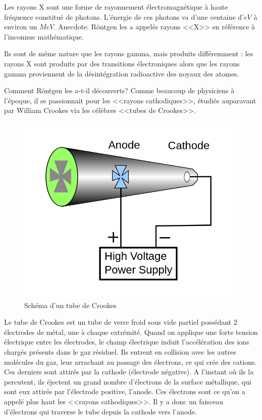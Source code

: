 Les rayons X sont une forme de rayonnement électromagnétique à haute fréquence constitué de photons. L'énergie de ces photons va d'une centaine d'$eV$ à environ un $MeV$. Anecdote: Röntgen les a appelés rayons <<X>> en référence à l'inconnue mathématique.

Ils sont de même nature que les rayons gamma, mais produits différemment : les rayons X sont produits par des transitions électroniques alors que les rayons gamma proviennent de la désintégration radioactive des noyaux des atomes.

Comment Röntgen les a-t-il découverts? Comme beaucoup de physiciens à l'époque, il se passionnait pour les <<rayons cathodiques>>, étudiés auparavant par William Crookes via les célèbres <<tubes de Crookes>>.

\begin{figure}[ht]
    \centering
    \includegraphics[scale=0.20]{Images1/tubecrookes.png}
    \caption{Schéma d'un tube de Crookes}
\end{figure}

Le tube de Crookes est un tube de verre froid sous vide partiel possédant 2 électrodes de métal, une à chaque extrémité. Quand on applique une forte tension électrique entre les électrodes, le champ électrique induit l'accélération des ions chargés présents dans le gaz résiduel. Ils entrent en collision avec les autres molécules du gaz, leur arrachant au passage des électrons, ce qui crée des cations. Ces derniers sont attirés par la cathode (électrode négative). A l'instant où ils la percutent, ils éjectent un grand nombre d'électrons de la surface métallique, qui sont eux attirés par l'électrode positive, l'anode. Ces électrons sont ce qu'on a appelé plus haut les <<rayons cathodiques>>. Il y a donc un faisceau d'électrons qui traverse le tube depuis la cathode vers l'anode.

